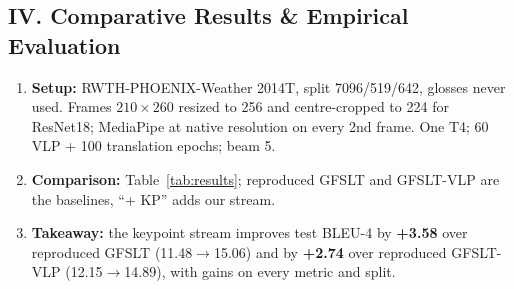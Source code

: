 \documentclass[8pt,a4paper]{article}
\begin{document}
\subsection*{IV. Comparative Results \& Empirical Evaluation}
\begin{enumerate}
    \item \textbf{Setup:} RWTH-PHOENIX-Weather 2014T, split 7096/519/642, glosses never used. Frames $210\times260$ resized to 256 and centre-cropped to 224 for ResNet18; MediaPipe at native resolution on every 2nd frame. One T4; 60 VLP + 100 translation epochs; beam 5.
    \item \textbf{Comparison:} Table~\ref{tab:results}; reproduced GFSLT and GFSLT-VLP are the baselines, ``+ KP'' adds our stream.
    \item \textbf{Takeaway:} the keypoint stream improves test BLEU-4 by \textbf{+3.58} over reproduced GFSLT (11.48$\to$15.06) and by \textbf{+2.74} over reproduced GFSLT-VLP (12.15$\to$14.89), with gains on every metric and split.
\end{enumerate}
\end{document}
